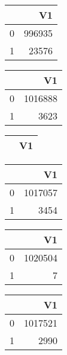 \bigskip\bigskip
\centering
\begin{tabular}{rr}
  \hline
 & V1 \\ 
  \hline
0 & 996935 \\ 
  1 & 23576 \\ 
   \hline
\end{tabular}

\bigskip\bigskip
\centering
\begin{tabular}{rr}
  \hline
 & V1 \\ 
  \hline
0 & 1016888 \\ 
  1 & 3623 \\ 
   \hline
\end{tabular}

\bigskip\bigskip
\centering
\begin{tabular}{rr}
  \hline
 & V1 \\ 
  \hline
\hline
\end{tabular}

\bigskip\bigskip
\centering
\begin{tabular}{rr}
  \hline
 & V1 \\ 
  \hline
0 & 1017057 \\ 
  1 & 3454 \\ 
   \hline
\end{tabular}

\bigskip\bigskip
\centering
\begin{tabular}{rr}
  \hline
 & V1 \\ 
  \hline
0 & 1020504 \\ 
  1 &   7 \\ 
   \hline
\end{tabular}

\bigskip\bigskip
\centering
\begin{tabular}{rr}
  \hline
 & V1 \\ 
  \hline
0 & 1017521 \\ 
  1 & 2990 \\ 
   \hline
\end{tabular}

